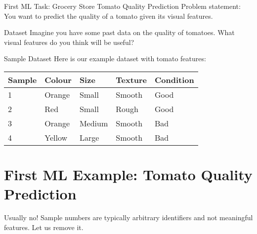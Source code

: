 \documentclass[usenames,dvipsnames]{beamer}
\begin{document}
\begin{frame}{First ML Task: Grocery Store Tomato Quality Prediction}
Problem statement: You want to predict the quality of a tomato given its visual features.
\end{frame}

\begin{frame}{Dataset}
Imagine you have some past data on the quality of tomatoes. What visual features do you think will be useful?

\end{frame}

\begin{frame}{Sample Dataset}
Here is our example dataset with tomato features: 

\begin{table}[]
	\begin{tabular}{|l|l|l|l||l|}
		\hline 
		\textbf{Sample} & \textbf{Colour} & \textbf{Size} & \textbf{Texture} & \textbf{Condition} \\ \hline 
		1      & Orange & Small & Smooth  & Good      \\
		2      & Red    & Small  & Rough  & Good \\
		3      & Orange & Medium & Smooth & Bad \\
		4      & Yellow & Large  & Smooth & Bad \\ \hline          
	\end{tabular}
\end{table}
\end{frame}

\section{First ML Example: Tomato Quality Prediction}


{{\color{magenta}Usually no!} Sample numbers are typically arbitrary identifiers and not meaningful features. Let us remove it.}

\end{document}
